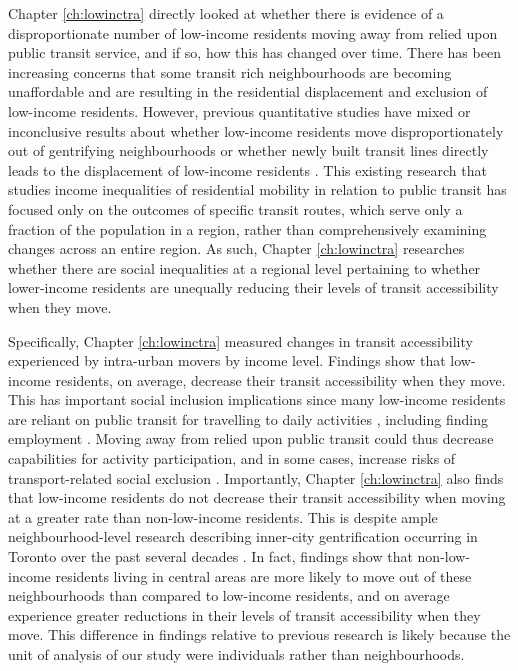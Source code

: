 Chapter \ref{ch:lowinctra} directly looked at whether there is evidence of a disproportionate number of low-income residents moving away from relied upon public transit service, and if so, how this has changed over time. There has been increasing concerns that some transit rich neighbourhoods are becoming unaffordable and are resulting in the residential displacement and exclusion of low-income residents. However, previous quantitative studies have mixed or inconclusive results about whether low-income residents move disproportionately out of gentrifying neighbourhoods or whether newly built transit lines directly leads to the displacement of low-income residents \cite{rayle_investigating_2015, zuk_gentrification_2018,padeiro_transit-oriented_2019,delmelle_transit-induced_2021}. This existing research that studies income inequalities of residential mobility in relation to public transit has focused only on the outcomes of specific transit routes, which serve only a fraction of the population in a region, rather than comprehensively examining changes across an entire region. As such, Chapter \ref{ch:lowinctra} researches whether there are social inequalities at a regional level pertaining to whether lower-income residents are unequally reducing their levels of transit accessibility when they move. 

Specifically, Chapter \ref{ch:lowinctra} measured changes in transit accessibility experienced by intra-urban movers by income level. Findings show that low-income residents, on average, decrease their transit accessibility when they move. This has important social inclusion implications since many low-income residents are reliant on public transit for travelling to daily activities \cite{allen_planning_2020,barri_can_2021}, including finding employment \cite{fransen_relationship_2019,bastiaanssen_does_2021}. Moving away from relied upon public transit could thus decrease capabilities for activity participation, and in some cases, increase risks of transport-related social exclusion \cite{lucas_transport_2012,allen_planning_2020}. Importantly, Chapter \ref{ch:lowinctra} also finds that low-income residents do not decrease their transit accessibility when moving at a greater rate than non-low-income residents. This is despite ample neighbourhood-level research describing inner-city gentrification occurring in Toronto over the past several decades \cite{hulchanski_three_2010,walks_gentrification_2021}. In fact, findings show that non-low-income residents living in central areas are more likely to move out of these neighbourhoods than compared to low-income residents, and on average experience greater reductions in their levels of transit accessibility when they move. This difference in findings relative to previous research is likely because the unit of analysis of our study were individuals rather than neighbourhoods.

